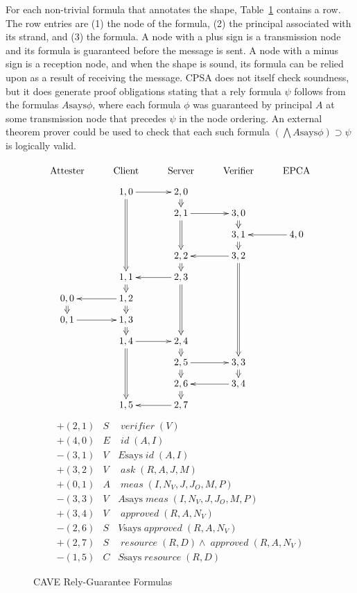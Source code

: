 \documentclass[titlepage,12pt]{article}
\theoremstyle{definition}
\newcommand{\inbnd}{\mathord -}
\newcommand{\outbnd}{\mathord +}
\newcommand{\says}{\mathbin{\mathrm{says}}}
\DeclareMathOperator{\id}{\mathit{id}}
\DeclareMathOperator{\resource}{\mathit{resource}}
\DeclareMathOperator{\approved}{\mathit{approved}}
\DeclareMathOperator{\ask}{\mathit{ask}}
\DeclareMathOperator{\meas}{\mathit{meas}}
\DeclareMathOperator{\verifier}{\mathit{verifier}}
\begin{document}
For each non-trivial formula that annotates the shape,
Table~\ref{fig:rg} contains a row.  The row entries are (1) the node
of the formula, (2) the principal associated with its strand, and (3)
the formula.  A node with a plus sign is a transmission node and its
formula is guaranteed before the message is sent.  A node with a minus
sign is a reception node, and when the shape is sound, its formula can
be relied upon as a result of receiving the message.  CPSA does not
itself check soundness, but it does generate proof obligations stating
that a rely formula $\psi$ follows from the formulas $A\says\phi$,
where each formula $\phi$ was guaranteed by principal $A$ at some
transmission node that precedes $\psi$ in the node ordering.  An
external theorem prover could be used to check that each such formula
$(\bigwedge A\says\phi)\supset \psi$ is logically valid.

\begin{figure}
$$\xymatrix@R=1.8ex{
\txt{\strut Attester}&\txt{\strut Client}&\txt{\strut Server}&\txt{\strut Verifier}&\txt{\strut EPCA}\\
&1,0\ar@{=>}[dddd]\ar[r]&2,0\ar@{=>}[d]&&\\
&&2,1\ar@{=>}[dd]\ar[r]&3,0\ar@{=>}[d]&\\
&&&3,1\ar@{=>}[d]&4,0\ar[l]\\
&&2,2\ar@{=>}[d]&3,2\ar@{=>}[ddddd]\ar[l]&\\
&1,1\ar@{=>}[d]&2,3\ar@{=>}[ddd]\ar[l]&&\\
0,0\ar@{=>}[d]&1,2\ar@{=>}[d]\ar[l]&&&\\
0,1\ar[r]&1,3\ar@{=>}[d]&&&\\
&1,4\ar@{=>}[ddd]\ar[r]&2,4\ar@{=>}[d]&&\\
&&2,5\ar@{=>}[d]\ar[r]&3,3\ar@{=>}[d]&\\
&&2,6\ar@{=>}[d]&3,4\ar[l]&\\
&1,5&2,7\ar[l]&&}$$
\begin{eqnarray*}
\outbnd(2,1)&S&\verifier(V)\\
\outbnd(4,0)&E&\id(A,I)\\
\inbnd(3,1)&V&E\says\id(A,I)\\
\outbnd(3,2)&V&\ask(R,A,J,M)\\
\outbnd(0,1)&A&\meas(I,N_V,J,J_O,M,P)\\
\inbnd(3,3)&V&A\says\meas(I,N_V,J,J_O,M,P)\\
\outbnd(3,4)&V&\approved(R,A,N_V)\\
\inbnd(2,6)&S&V\says\approved(R,A,N_V)\\
\outbnd(2,7)&S&\resource(R,D) \wedge \approved(R,A,N_V)\\
\inbnd(1,5)&C&S\says\resource(R,D)
\end{eqnarray*}
\caption{CAVE Rely-Guarantee Formulas}\label{fig:rg}
\end{figure}
\end{document}
